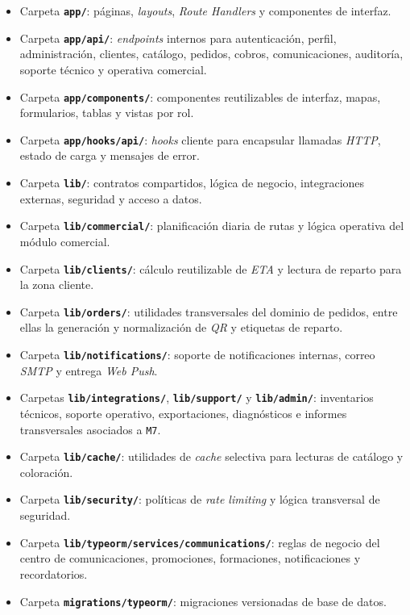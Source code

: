 \begin{itemize}
    \item Carpeta \textbf{\texttt{app/}}: páginas, \textit{layouts}, \textit{Route Handlers} y componentes de interfaz.
    \item Carpeta \textbf{\texttt{app/api/}}: \textit{endpoints} internos para autenticación, perfil, administración, clientes, catálogo, pedidos, cobros, comunicaciones, auditoría, soporte técnico y operativa comercial.
    \item Carpeta \textbf{\texttt{app/components/}}: componentes reutilizables de interfaz, mapas, formularios, tablas y vistas por rol.
    \item Carpeta \textbf{\texttt{app/hooks/api/}}: \textit{hooks} cliente para encapsular llamadas \textit{HTTP}, estado de carga y mensajes de error.
    \item Carpeta \textbf{\texttt{lib/}}: contratos compartidos, lógica de negocio, integraciones externas, seguridad y acceso a datos.
    \item Carpeta \textbf{\texttt{lib/commercial/}}: planificación diaria de rutas y lógica operativa del módulo comercial.
    \item Carpeta \textbf{\texttt{lib/clients/}}: cálculo reutilizable de \textit{ETA} y lectura de reparto para la zona cliente.
    \item Carpeta \textbf{\texttt{lib/orders/}}: utilidades transversales del dominio de pedidos, entre ellas la generación y normalización de \textit{QR} y etiquetas de reparto.
    \item Carpeta \textbf{\texttt{lib/notifications/}}: soporte de notificaciones internas, correo \textit{SMTP} y entrega \textit{Web Push}.
    \item Carpetas \textbf{\texttt{lib/integrations/}}, \textbf{\texttt{lib/support/}} y \textbf{\texttt{lib/admin/}}: inventarios técnicos, soporte operativo, exportaciones, diagnósticos e informes transversales asociados a \texttt{M7}.
    \item Carpeta \textbf{\texttt{lib/cache/}}: utilidades de \textit{cache} selectiva para lecturas de catálogo y coloración.
    \item Carpeta \textbf{\texttt{lib/security/}}: políticas de \textit{rate limiting} y lógica transversal de seguridad.
    \item Carpeta \textbf{\texttt{lib/typeorm/services/communications/}}: reglas de negocio del centro de comunicaciones, promociones, formaciones, notificaciones y recordatorios.
    \item Carpeta \textbf{\texttt{migrations/typeorm/}}: migraciones versionadas de base de datos.
\end{itemize}

